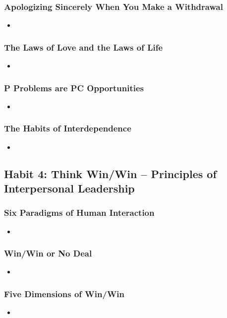 \documentclass[11pt]{article}
\begin{document}
\subsubsection{Apologizing Sincerely When You Make a Withdrawal}
\begin{itemize}
\item 
\end{itemize}
\subsubsection{The Laws of Love and the Laws of Life}
\begin{itemize}
\item 
\end{itemize}
\subsubsection{P Problems are PC Opportunities}
\begin{itemize}
\item 
\end{itemize}
\subsubsection{The Habits of Interdependence}
\begin{itemize}
\item 
\end{itemize}
\subsection{Habit 4: Think Win/Win -- Principles of Interpersonal Leadership}
\subsubsection{Six Paradigms of Human Interaction}
\begin{itemize}
\item 
\end{itemize}
\subsubsection{Win/Win or No Deal}
\begin{itemize}
\item 
\end{itemize}
\subsubsection{Five Dimensions of Win/Win}
\begin{itemize}
\item 
\end{itemize}
\end{document}
